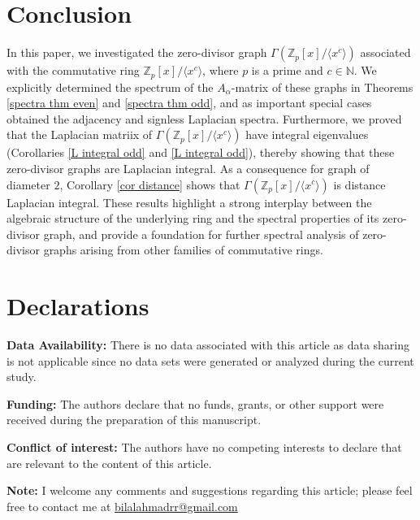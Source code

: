 \documentclass[12pt,twoside]{article}
\begin{document}
	
	
	
	
	
	
\section*{Conclusion}
In this paper, we investigated the zero-divisor graph $ \varGamma\!\left(\mathbb{Z}_{p}[x]/\langle x^{c} \rangle\right)$ associated with the commutative ring $\mathbb{Z}_{p}[x]/\langle x^{c} \rangle$, where $p$ is a prime and $c\in\mathbb{N}$. We explicitly determined the spectrum of the $A_{\alpha}$-matrix of these graphs in Theorems \ref{spectra thm even} and \ref{spectra thm odd}, and as important special cases obtained the adjacency and signless Laplacian spectra. Furthermore, we proved that the Laplacian matriix of $ \varGamma\!\left(\mathbb{Z}_{p}[x]/\langle x^{c} \rangle\right)$ have integral eigenvalues (Corollaries \ref{L integral odd} and \ref{L integral odd}), thereby showing that these zero-divisor graphs are Laplacian integral. As a consequence for graph of diameter $2$, Corollary \ref{cor distance} shows that $ \varGamma\!\left(\mathbb{Z}_{p}[x]/\langle x^{c} \rangle\right)$ is  distance Laplacian integral. These results highlight a strong interplay between the algebraic structure of the underlying ring and the spectral properties of its zero-divisor graph, and provide a foundation for further spectral analysis of zero-divisor graphs arising from other families of commutative rings.

	
	
	\section*{Declarations}
	\noindent \textbf{Data Availability:}	There is no data associated with this article as data sharing is not applicable since no data sets were generated or analyzed during the current study.
	
	\noindent \textbf{Funding:} The authors declare that no funds, grants, or other support were received during the preparation of this manuscript.
	
	\noindent \textbf{Conflict of interest:} The authors have no competing interests to declare that are relevant to the content of this article.
	
	\noindent\textbf{Note:} I welcome any comments and suggestions regarding this article; please feel free to contact
	me at \href{bilalahmadrr@gmail.com}{bilalahmadrr@gmail.com}
	
\end{document}
